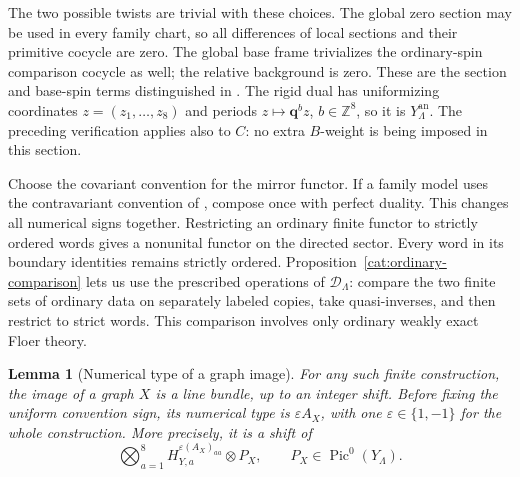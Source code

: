 \documentclass[11pt]{article}
\newtheorem{lemma}[theorem]{Lemma}
\theoremstyle{definition}
\theoremstyle{remark}
\numberwithin{equation}{section}
\begin{document}
The two possible twists are trivial with these choices.  The global
zero section may be used in every family chart, so all differences of
local sections and their primitive cocycle are zero.  The global
base frame trivializes the ordinary-spin comparison cocycle as well;
the relative background is zero.  These are the section and base-spin
terms distinguished in \cite[Remark~2.16]{abouzaid-hms}.  The rigid dual
has uniformizing coordinates $z=(z_1,\ldots,z_8)$ and periods
$z\mapsto\mathbf q^b z$, $b\in\mathbb Z^8$, so it is $Y_\Lambda^{\mathrm{an}}$.
The preceding verification applies also to $C$: no extra $B$-weight is
being imposed in this section.

Choose the covariant convention for the mirror functor.  If a family
model uses the contravariant convention of
\cite[Equation~(1.1)]{abouzaid-hms}, compose once with perfect duality.
This changes all numerical signs together.  Restricting an ordinary
finite functor to strictly ordered words gives a nonunital functor on
the directed sector.  Every word in its boundary identities remains
strictly ordered.  Proposition~\ref{cat:ordinary-comparison} lets
us use the prescribed operations of $\mathcal D_\Lambda$: compare the
two finite sets of ordinary data on separately labeled copies, take
quasi-inverses, and then restrict to strict words.  This comparison
involves only ordinary weakly exact Floer theory.

\begin{lemma}[Numerical type of a graph image]
\label{mirror:graph-image}
For any such finite construction, the image of a graph $X$ is a line
bundle, up to an integer shift.  Before fixing the uniform convention
sign, its numerical type is $\varepsilon A_X$, with one
$\varepsilon\in\{1,-1\}$ for the whole construction.  More precisely,
it is a shift of
\[
 \bigotimes_{a=1}^8H_{Y,a}^{\varepsilon(A_X)_{aa}}\otimes P_X,
 \qquad P_X\in\operatorname{Pic}^0(Y_\Lambda).
\]
\end{lemma}
\end{document}
